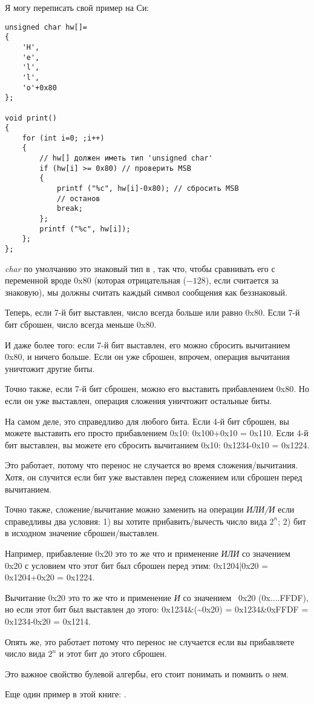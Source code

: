 Я могу переписать свой пример на Си:

\begin{lstlisting}[style=customc]
unsigned char hw[]=
{
	'H',
	'e',
	'l',
	'l',
	'o'+0x80
};

void print()
{
	for (int i=0; ;i++)
	{
		// hw[] должен иметь тип 'unsigned char'
		if (hw[i] >= 0x80) // проверить MSB
		{
			printf ("%c", hw[i]-0x80); // сбросить MSB
			// останов
			break;
		};
		printf ("%c", hw[i]);
	};
};
\end{lstlisting}

\emph{char} по умолчанию это знаковый тип в \CCpp, так что, чтобы сравнивать его с переменной вроде 0x80 (которая отрицательная
($-128$),
если считается за знаковую),
мы должны считать каждый символ сообщения как беззнаковый.

Теперь, если 7-й бит выставлен, число всегда больше или равно 0x80.
Если 7-й бит сброшен, число всегда меньше 0x80.

И даже более того: если 7-й бит выставлен, его можно сбросить вычитанием 0x80, и ничего больше.
Если он уже сброшен, впрочем, операция вычитания уничтожит другие биты.

Точно также, если 7-й бит сброшен, можно его выставить прибавлением 0x80.
Но если он уже выставлен, операция сложения уничтожит остальные биты.

На самом деле, это справедливо для любого бита.
Если 4-й бит сброшен, вы можете выставить его просто прибавлением 0x10: 0x100+0x10 = 0x110.
Если 4-й бит выставлен, вы можете его сбросить вычитанием 0x10: 0x1234-0x10 = 0x1224.

Это работает, потому что перенос не случается во время сложения/вычитания.
Хотя, он случится если бит уже выставлен перед сложением или сброшен перед вычитанием.

Точно также, сложение/вычитание можно заменить на операции \emph{ИЛИ/И} если справедливы два условия:
1) вы хотите прибавить/вычесть число вида $2^n$;
2) бит в исходном значение сброшен/выставлен.

Например, прибавление 0x20 это то же что и применение \emph{ИЛИ} со значением 0x20 с условием что этот бит был сброшен перед
этим:
0x1204|0x20 = 0x1204+0x20 = 0x1224.

Вычитание 0x20 это то же что и применение \emph{И} со значением ~0x20 (0x....FFDF), но если этот бит был выставлен до этого:
0x1234\&(\~{}0x20) = 0x1234\&0xFFDF = 0x1234-0x20 = 0x1214.

Опять же, это работает потому что перенос не случается если вы прибавляете число вида $2^n$ и этот бит до этого сброшен.

Это важное свойство булевой алгербы, его стоит понимать и помнить о нем.

Еще один пример в этой книге: .

